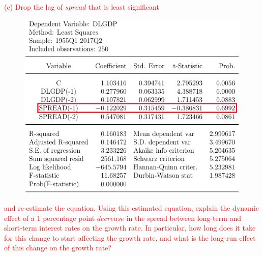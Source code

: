 \documentclass[12pt]{report}
\begin{document}
\noindent \textcolor{red}{(c) Drop the lag of $spread$ that is least significant \begin{figure}[H]
		\centerline{\includegraphics{tute11_46}}
	\end{figure}
	\vspace{-\baselineskip} \noindent and re-estimate the equation. Using this estimated equation, explain the dynamic effect of a 1 percentage point $decrease$ in the spread between long-term and short-term interest rates on the growth rate. In particular, how long does it take for this change to start affecting the growth rate, and what is the long-run effect of this change on the growth rate?}
\end{document}
